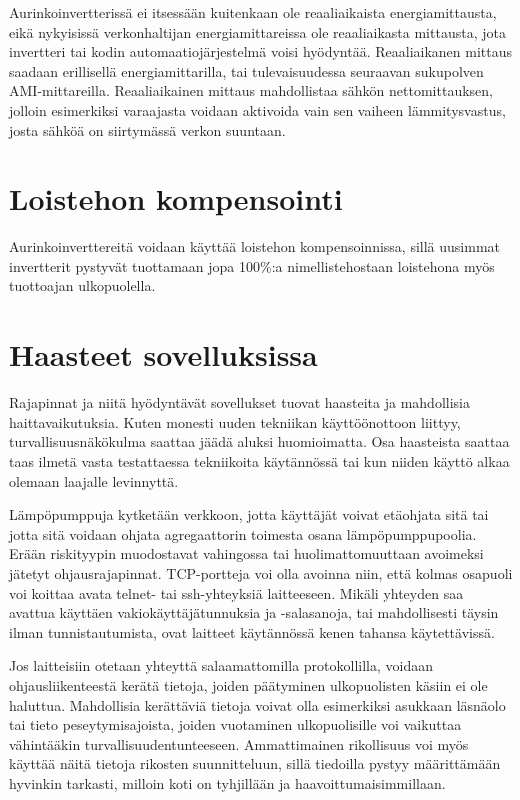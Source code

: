   Aurinkoinvertterissä ei itsessään kuitenkaan ole reaaliaikaista energiamittausta, eikä nykyisissä verkonhaltijan energiamittareissa ole reaaliaikasta mittausta, jota invertteri tai kodin automaatiojärjestelmä voisi hyödyntää. Reaaliaikanen mittaus saadaan erillisellä energiamittarilla, tai tulevaisuudessa seuraavan sukupolven AMI-mittareilla. Reaaliaikainen mittaus mahdollistaa sähkön nettomittauksen, jolloin esimerkiksi varaajasta voidaan aktivoida vain sen vaiheen lämmitysvastus, josta sähköä on siirtymässä verkon suuntaan.

\section{Loistehon kompensointi}
  Aurinkoinverttereitä voidaan käyttää loistehon kompensoinnissa, sillä uusimmat invertterit pystyvät tuottamaan jopa 100\%:a nimellistehostaan loistehona myös tuottoajan ulkopuolella. 

\section{Haasteet sovelluksissa}

  Rajapinnat ja niitä hyödyntävät sovellukset tuovat haasteita ja mahdollisia haittavaikutuksia. Kuten monesti uuden tekniikan käyttöönottoon liittyy, turvallisuusnäkökulma saattaa jäädä aluksi huomioimatta. Osa haasteista saattaa taas ilmetä vasta testattaessa tekniikoita käytännössä tai kun niiden käyttö alkaa olemaan laajalle levinnyttä.

  Lämpöpumppuja kytketään verkkoon, jotta käyttäjät voivat etäohjata sitä tai jotta sitä voidaan ohjata agregaattorin toimesta osana lämpöpumppupoolia. Erään riskityypin muodostavat vahingossa tai huolimattomuuttaan avoimeksi jätetyt ohjausrajapinnat. TCP-portteja voi olla avoinna niin, että kolmas osapuoli voi koittaa avata telnet- tai ssh-yhteyksiä laitteeseen. Mikäli yhteyden saa avattua käyttäen vakiokäyttäjätunnuksia ja -salasanoja, tai mahdollisesti täysin ilman tunnistautumista, ovat laitteet käytännössä kenen tahansa käytettävissä. 
  
  Jos laitteisiin otetaan yhteyttä salaamattomilla protokollilla, voidaan ohjausliikenteestä kerätä tietoja, joiden päätyminen ulkopuolisten käsiin ei ole haluttua. Mahdollisia kerättäviä tietoja voivat olla esimerkiksi asukkaan läsnäolo tai tieto peseytymisajoista, joiden vuotaminen ulkopuolisille voi vaikuttaa vähintääkin turvallisuudentunteeseen. Ammattimainen rikollisuus voi myös käyttää näitä tietoja rikosten suunnitteluun, sillä tiedoilla pystyy määrittämään hyvinkin tarkasti, milloin koti on tyhjillään ja haavoittumaisimmillaan.

